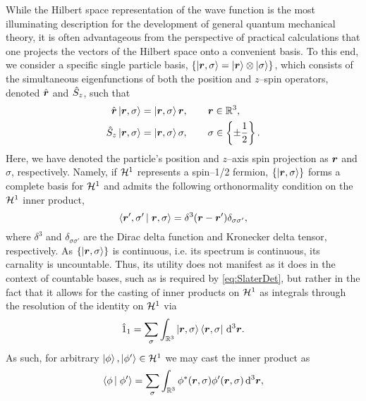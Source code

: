 While the Hilbert space representation of the wave function is the most illuminating description for the development of
general quantum mechanical theory, it is often advantageous from the perspective of practical calculations that one
projects the vectors of the Hilbert space onto a convenient basis. 
To this end, we consider a specific single particle basis, $\left \lbrace \left\vert \boldsymbol{r},\sigma \right\rangle = \left\vert \boldsymbol{r} \right\rangle\otimes\left\vert \sigma \right\rangle \right\rbrace$, 
which consists of the simultaneous eigenfunctions
of both the position and $z$--spin operators, denoted $\hat{\boldsymbol{r}}$ and $\hat{S}_z$,
such that
\begin{subequations}
\begin{align}
  \hat{\boldsymbol{r}}\left\vert \boldsymbol{r},\sigma \right\rangle &= \left\vert \boldsymbol{r},\sigma \right\rangle\boldsymbol{r}, \qquad \boldsymbol{r}\in\mathbb{R}^3, \\
  \hat{S}_z\left\vert \boldsymbol{r},\sigma \right\rangle    &= \left\vert \boldsymbol{r},\sigma \right\rangle\sigma, \qquad \sigma \in \left \lbrace \pm\frac{1}{2} \right\rbrace.
\end{align}
\end{subequations}
Here, we have denoted the particle's position and $z$--axis spin projection as $\boldsymbol{r}$ and $\sigma$, respectively.
Namely, if $\mathcal{H}^1$ represents a spin--1/2 fermion, $\left \lbrace \left\vert \boldsymbol{r},\sigma \right\rangle \right\rbrace$ forms a complete basis for $\mathcal{H}^1$ 
and admits the following orthonormality  condition on the $\mathcal{H}^1$ inner product,
\begin{equation}
  \label{eq:SpinorInner}
  \left\langle \boldsymbol{r}',\sigma' \left\vert\right. \boldsymbol{r},\sigma \right\rangle = \delta^3(\boldsymbol{r} - \boldsymbol{r}')\delta_{\sigma\sigma'},
\end{equation}
where $\delta^3$ and $\delta_{\sigma\sigma'}$ are the Dirac delta function and Kronecker delta tensor, respectively.
As $\left \lbrace \left\vert \boldsymbol{r},\sigma \right\rangle \right\rbrace$ is continuous, i.e. its spectrum is continuous, its carnality is uncountable. Thus,
its utility does not manifest as it does in the context of countable bases, such as is required by \cref{eq:SlaterDet},
but rather in the fact that it allows for the casting of inner products on $\mathcal{H}^1$ as integrals through the resolution
of the identity on $\mathcal{H}^1$ via
\begin{equation}
  \label{eq:H1Identity}
  \hat{1}_1 = \sum_\sigma \int_{\mathbb R ^3} \left\vert \boldsymbol{r},\sigma \right\rangle\left\langle \boldsymbol{r},\sigma \right\vert \,\mathrm{d}^3\boldsymbol{r}.
\end{equation}
As such, for arbitrary $\left\vert \phi \right\rangle,\left\vert \phi' \right\rangle\in\mathcal{H}^1$ we may cast the inner product as
\begin{equation}
\left\langle \phi \left\vert\right. \phi' \right\rangle = \sum_\sigma \int_{\mathbb R ^3} \phi^*(\boldsymbol{r},\sigma) \phi'(\boldsymbol{r},\sigma) \,\mathrm{d}^3\boldsymbol{r},
\end{equation}
